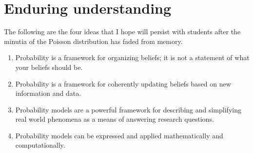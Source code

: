 \documentclass{article}
\begin{document}
\raggedright
\section*{Enduring understanding}
The following are the four ideas that I hope will persist with students after the minutia of the Poisson distribution has faded from memory.  
\begin{enumerate}
    \item Probability is a framework for organizing beliefs; it is not a statement of what your beliefs should be.
    \item Probability is a framework for coherently updating beliefs based on new information and data.
    \item Probability models are a powerful framework for describing and simplifying real world phenomena as a means of answering research questions.
    \item Probability models can be expressed and applied mathematically and computationally.
\end{enumerate}
\end{document}
